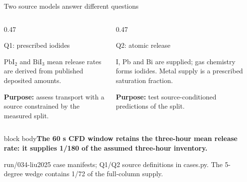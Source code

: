 \documentclass[aspectratio=169,10pt]{beamer}
\newcommand{\PbI}{\ensuremath{\mathrm{PbI}_2}}
\newcommand{\BiI}{\ensuremath{\mathrm{BiI}_3}}
\newcommand{\sources}[1]{\par\vfill{\raggedright\fontsize{6.2}{7.5}\selectfont\color{PSIgray}#1\par}}
\newcommand{\takeaway}[1]{\par\vspace{0.2em}\begin{beamercolorbox}[sep=0.4em,wd=\linewidth]{block body}{\small\textbf{#1}}\end{beamercolorbox}}
\begin{document}
\begin{frame}[t]{Two source models answer different questions}
  \begin{columns}[t,onlytextwidth]
    \begin{column}{0.47\textwidth}
      \begin{block}{Q1: prescribed iodides}
        \small\raggedright\PbI{} and \BiI{} mean release rates are derived from published deposited amounts.\par\vspace{0.5em}
        \textbf{Purpose:} assess transport with a source constrained by the measured split.
      \end{block}
    \end{column}
    \begin{column}{0.47\textwidth}
      \begin{block}{Q2: atomic release}
        \small\raggedright I, Pb and Bi are supplied; gas chemistry forms iodides. Metal supply is a prescribed saturation fraction.\par\vspace{0.5em}
        \textbf{Purpose:} test source-conditioned predictions of the split.
      \end{block}
    \end{column}
  \end{columns}
  \takeaway{The 60 s CFD window retains the three-hour mean release rate: it supplies 1/180 of the assumed three-hour inventory.}
  \sources{run/034-liu2025 case manifests; Q1/Q2 source definitions in cases.py. The 5-degree wedge contains 1/72 of the full-column supply.}
\end{frame}
\end{document}
